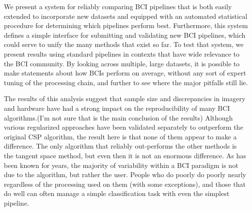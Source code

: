 We present a system for reliably comparing BCI pipelines that is both easily
extended to incorporate new datasets and equipped with an automated statistical
procedure for determining which pipelines perform best. Furthermore, this system
defines a simple interface for submitting and validating new BCI pipelines,
which could serve to unify the many methods that exist so far. To test that
system, we present results using standard pipelines in contexts that have wide
relevance to the BCI community. By looking across multiple, large datasets, it is possible to make statements about how BCIs perform on average, without any sort of expert tuning of the processing chain, and further to see where the major pitfalls still lie.

The results of this analysis suggest that sample size and discrepancies in imagery and hardware have had a strong impact on the reproducibility of many BCI algorithms.(I'm not sure that is the main conclusion of the results) Although various regularized approaches have been validated separately to outperform the original CSP algorithm, the result here is that none of them appear to make a difference. The only algorithm that reliably out-performs the other methods is the tangent space method, but even then it is not an enormous difference. As has been known for years, the majority of variability within a BCI paradigm is not due to the algorithm, but rather the user. People who do poorly do poorly nearly regardless of the processing used on them (with some exceptions), and those that do well can often manage a simple classification task with even the simplest pipeline.


